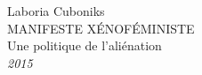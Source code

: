 \begin{titlepage}
    \raggedleft
    {\Large Laboria Cuboniks\\[1in]}
    {\Huge\scshape MANIFESTE XÉNOFÉMINISTE\\[.2in]}
    {\large Une politique de l’aliénation\\}
    \vfill
    {\itshape 2015}
    \end{titlepage}